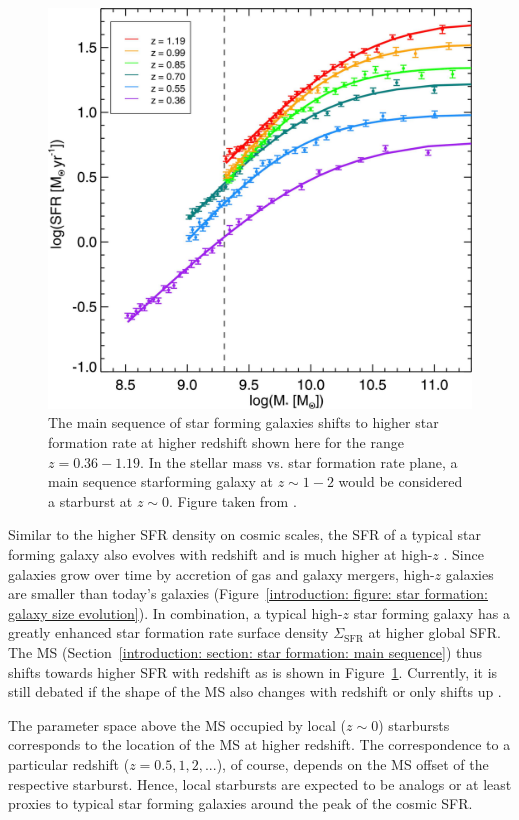 \begin{figure}
	\centering
	\includegraphics[width=0.6\linewidth]{images/chapters/introduction/sf/ms_shift.pdf}
	\caption[Redshift dependence of the main sequence]{The main sequence of star forming galaxies shifts to higher star formation rate at higher redshift shown here for the range $z =0.36 - 1.19$. In the stellar mass vs. star formation rate plane, a main sequence starforming galaxy at $z \sim 1-2$ would be considered a starburst at $z \sim 0$. Figure taken from \citet{2015ApJ...801...80L}.}
	\label{introduction: figure: star formation: MS shift}
\end{figure}

Similar to the higher SFR density on cosmic scales, the SFR of a typical star forming galaxy also evolves with redshift and is much higher at high-$z$ \citep[e.g.][]{2012ApJ...754L..29W,2014ApJ...795..104W}. Since galaxies grow over time by accretion of gas and galaxy mergers, high-$z$ galaxies are smaller than today's galaxies (Figure~\ref{introduction: figure: star formation: galaxy size evolution}). In combination, a typical high-$z$ star forming galaxy has a greatly enhanced star formation rate surface density $\Sigma_\mathrm{SFR}$ at higher global SFR. The MS (Section~\ref{introduction: section: star formation: main sequence}) thus shifts towards higher SFR with redshift as is shown in Figure~\ref{introduction: figure: star formation: MS shift}. Currently, it is still debated if the shape of the MS also changes with redshift or only shifts up \citep[e.g.][]{2019MNRAS.490.5285P}.

The parameter space above the MS occupied by local ($z \sim 0$) starbursts corresponds to the location of the MS at higher redshift. The correspondence to a particular redshift ($z = 0.5,1,2,...$), of course, depends on the MS offset of the respective starburst. Hence, local starbursts are expected to be analogs or at least proxies to typical star forming galaxies around the peak of the cosmic SFR.


